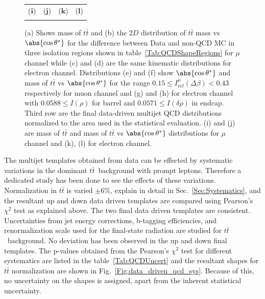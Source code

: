\begin{figure}[htp]
\begin{tabular}{cccc}
($\mathbf{i}$)\qquad\qquad&($\mathbf{j}$)\qquad\qquad&($\mathbf{k}$)\qquad\qquad&($\mathbf{l}$)\qquad\qquad\\
\\
\end{tabular}
\caption{(a) Shows mass of $t\bar{t}$ and (b) the 2$D$ distribution of $t\bar{t}$ mass vs $\abs{\cos\theta^*}$ for the difference between Data and non-QCD MC in three isolation regions shown in table~\ref{Tab:QCDShapeRegions} for $\mu$ channel while (c) and (d) are the same kinematic distributions for electron channel. Distributions (e) and (f) show $\abs{\cos\theta^*}$ and mass of $t\bar{t}$ vs $\abs{\cos\theta^*}$ for the range  $0.15 \leq I_{rel}^{\mu}(\Delta\beta) < 0.43$ respectively for muon channel and (g) and (h) for electron channel with $0.0588 \leq I(\rho)$ for barrel and $0.0571 \leq I(\delta\rho)$ in endcap. Third row are the final data-driven multijet QCD distributions normalized to the area used in the statistical evaluation. (i) and (j) are mass of $t\bar{t}$ and mass of $t\bar{t}$ vs $\abs{\cos\theta^*}$ distributions for $\mu$ channel and (k), (l) for electron channel.}
\label{Fig:data_driven_qcd}
\end{figure}
  
The multijet templates obtained from data can be effected by systematic variations in the dominant $t\bar t$~background with prompt leptons. Therefore a dedicated study has been done to see the effects of these variations. Normalization in $t\bar t$ is varied $\pm$6\%, explain in detail in Sec.~\ref{Sec:Systematics}, and the resultant up and down data driven templates are compared using Pearson's $\chi^{2}$ test as explained above. The two final data driven templates are consistent. Uncertainties from jet energy corrections, b-tagging efficiencies, and renormalization scale used for the final-state radiation are studied for $t\bar t$~background. No deviation has been observed in the up and down final templates. The p-values obtained from the Pearson's $\chi^{2}$ test for different systematics are listed in the table~\ref{Tab:QCDUncert} and the resultant shapes for $t\bar t$ normalization are shown in Fig.~\ref{Fig:data_driven_qcd_sys}. Because of this, no uncertainty on the shapes is assigned, apart from the inherent statistical uncertainty.     

